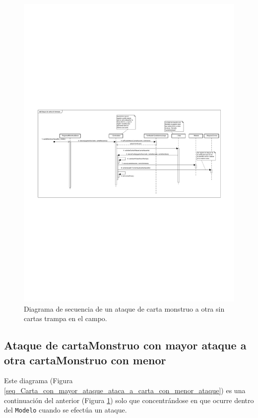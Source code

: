 	\begin{figure}[H]
		\centering
		\includegraphics[scale=0.9]{includes/seq_Ataque_de_carta_sin_trampas}
		\caption{Diagrama de secuencia de un ataque de carta monstruo a otra sin cartas trampa en el campo.}
		\label{seq_Ataque_de_carta_sin_trampas}
	\end{figure}
	
	
	\subsection{Ataque de cartaMonstruo con mayor ataque a otra cartaMonstruo con menor}
	
	Este diagrama (Figura \ref{seq_Carta_con_mayor_ataque_ataca_a_carta_con_menor_ataque}) es una continuación del anterior (Figura \ref{seq_Ataque_de_carta_sin_trampas}) solo que concentrándose en que ocurre dentro del \texttt{Modelo} cuando se efectúa un ataque.
	
